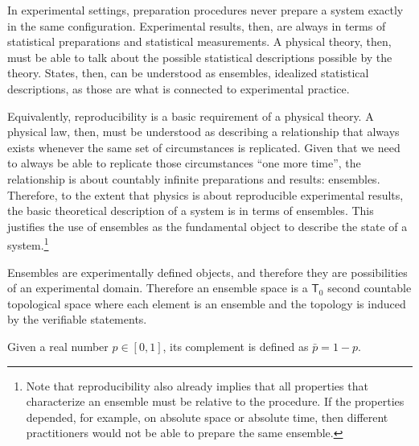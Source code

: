 \documentclass[10pt,twocolumn, nofootinbib]{revtex4-2}
\begin{document}
\begin{justification}
	In experimental settings, preparation procedures never prepare a system exactly in the same configuration. Experimental results, then, are always in terms of statistical preparations and statistical measurements. A physical theory, then, must be able to talk about the possible statistical descriptions possible by the theory. States, then, can be understood as ensembles, idealized statistical descriptions, as those are what is connected to experimental practice.
	
	Equivalently, reproducibility is a basic requirement of a physical theory. A physical law, then, must be understood as describing a relationship that always exists whenever the same set of circumstances is replicated. Given that we need to always be able to replicate those circumstances ``one more time'', the relationship is about countably infinite preparations and results: ensembles. Therefore, to the extent that physics is about reproducible experimental results, the basic theoretical description of a system is in terms of ensembles. This justifies the use of ensembles as the fundamental object to describe the state of a system.\footnote{Note that reproducibility also already implies that all properties that characterize an ensemble must be relative to the procedure. If the properties depended, for example, on absolute space or absolute time, then different practitioners would not be able to prepare the same ensemble.}
	
	Ensembles are experimentally defined objects, and therefore they are possibilities of an experimental domain. Therefore an ensemble space is a $\mathsf{T}_0$ second countable topological space where each element is an ensemble and the topology is induced by the verifiable statements.
\end{justification}

\begin{defn}
	Given a real number $p \in [0,1]$, its complement is defined as $\bar{p} = 1-p$.
\end{defn}
\end{document}
